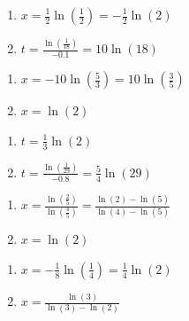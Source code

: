 \begin{multicols}{2}
\begin{enumerate}
\setcounter{enumi}{\value{HW}}


\item $x=\frac{1}{2}\ln\left(\frac{1}{2}\right) = -\frac{1}{2}\ln(2)$
\item $t = \frac{\ln\left(\frac{1}{18}\right)}{-0.1} =10 \ln(18)$



\setcounter{HW}{\value{enumi}}
\end{enumerate}
\end{multicols}

\begin{multicols}{2}
\begin{enumerate}
\setcounter{enumi}{\value{HW}}


\item $x=-10\ln\left(\frac{5}{3}\right) = 10\ln\left(\frac{3}{5}\right)$
\item$x=\ln(2)$

\setcounter{HW}{\value{enumi}}
\end{enumerate}
\end{multicols}

\begin{multicols}{2}
\begin{enumerate}
\setcounter{enumi}{\value{HW}}

\item $t=\frac{1}{3}\ln(2)$
\item $t = \frac{\ln\left(\frac{1}{29}\right)}{-0.8} = \frac{5}{4}\ln(29)$

\setcounter{HW}{\value{enumi}}
\end{enumerate}
\end{multicols}

\begin{multicols}{2}
\begin{enumerate}
\setcounter{enumi}{\value{HW}}

\item $x = \frac{\ln\left(\frac{2}{5}\right)}{\ln\left(\frac{4}{5}\right)} = \frac{\ln(2)-\ln(5)}{\ln(4) - \ln(5)}$

\item $x =  \ln(2)$


\setcounter{HW}{\value{enumi}}
\end{enumerate}
\end{multicols}

\begin{multicols}{2}
\begin{enumerate}
\setcounter{enumi}{\value{HW}}


\item  $x = -\frac{1}{8} \ln\left(\frac{1}{4} \right) = \frac{1}{4}\ln(2)$

\item $x = \frac{\ln(3)}{\ln(3) - \ln(2)}$

\setcounter{HW}{\value{enumi}}
\end{enumerate}
\end{multicols}

